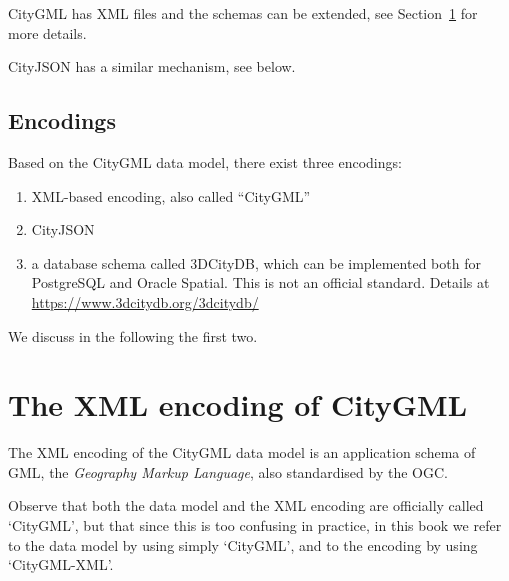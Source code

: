 CityGML has XML files and the schemas can be extended, see Section~\ref{sec:citygmlxml} for more details. 

CityJSON has a similar mechanism, see below.








\subsection{Encodings}

Based on the CityGML data model, there exist three encodings:
\begin{enumerate}
  \item XML-based encoding, also called ``CityGML''
  \item CityJSON
  \item a database schema called 3DCityDB, which can be implemented both for PostgreSQL and Oracle Spatial. This is not an official standard. Details at \url{https://www.3dcitydb.org/3dcitydb/}
\end{enumerate}
We discuss in the following the first two.


\section[XML-encoded CityGML]{The XML encoding of CityGML}%
\label{sec:citygmlxml}

The XML encoding of the CityGML data model is an application schema of GML, the \emph{Geography Markup Language}, also standardised by the OGC.

Observe that both the data model and the XML encoding are officially called `CityGML', but that since this is too confusing in practice, in this book we refer to the data model by using simply `CityGML', and to the encoding by using `CityGML-XML'.


